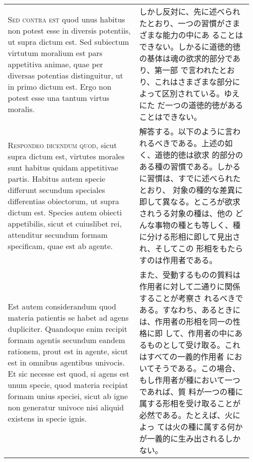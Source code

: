 \documentclass[10pt]{jsarticle}
\begin{document}
\begin{longtable}{p{21em}p{21em}}
{\scshape Sed contra est} quod unus habitus non potest esse in
diversis potentiis, ut supra dictum est. Sed subiectum virtutum
moralium est pars appetitiva animae, quae per diversas potentias
distinguitur, ut in primo dictum est. Ergo non potest esse una tantum
virtus moralis.

&

しかし反対に、先に述べられたとおり、一つの習慣がさまざまな能力の中にあ
ることはできない。しかるに道徳的徳の基体は魂の欲求的部分であり、第一部
で言われたとおり、これはさまざまな部分によって区別されている。ゆえにた
だ一つの道徳的徳があることはできない。

\\



 {\scshape Respondeo dicendum quod}, sicut supra dictum est, virtutes
 morales sunt habitus quidam appetitivae partis. Habitus autem specie
 differunt secundum speciales differentias obiectorum, ut supra dictum
 est. Species autem obiecti appetibilis, sicut et cuiuslibet rei,
 attenditur secundum formam specificam, quae est ab agente.


&

 解答する。以下のように言われるべきである。上述の如く、道徳的徳は欲求
 的部分のある種の習慣である。しかるに習慣は、すでに述べられたとおり、
 対象の種的な差異に即して異なる。ところが欲求されうる対象の種は、他の
 どんな事物の種とも等しく、種に分ける形相に即して見出され、そしてこの
 形相をもたらすのは作用者である。

\\


 Est autem considerandum quod materia patientis se habet ad agens
 dupliciter. Quandoque enim recipit formam agentis secundum eandem
 rationem, prout est in agente, sicut est in omnibus agentibus
 univocis. Et sic necesse est quod, si agens est unum specie, quod
 materia recipiat formam unius speciei, sicut ab igne non generatur
 univoce nisi aliquid existens in specie ignis.

&

 また、受動するものの質料は作用者に対して二通りに関係することが考察さ
 れるべきである。すなわち、あるときには、作用者の形相を同一の性格に即
 して、作用者の中にあるものとして受け取る。これはすべての一義的作用者
 においてそうである。この場合、もし作用者が種において一つであれば、質
 料が一つの種に属する形相を受け取ることが必然である。たとえば、火によっ
 ては火の種に属する何かが一義的に生み出されるしかない。


\\



\end{longtable}
\end{document}
